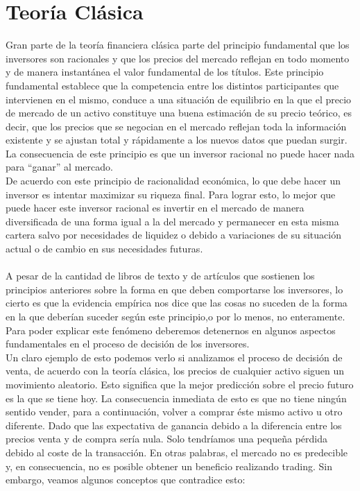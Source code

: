 \section{Teoría Clásica}

Gran parte de la teoría financiera clásica parte del principio fundamental que los inversores son racionales y que los precios del mercado reflejan en todo momento y de manera instantánea el valor fundamental de los títulos.
Este principio fundamental establece que la competencia entre los distintos participantes que intervienen en el mismo, conduce a una situación de equilibrio en la que el precio de mercado de un activo constituye una buena estimación de su precio teórico, es decir, que los precios que se negocian en el mercado reflejan toda la información existente y se ajustan total y rápidamente a los nuevos datos que puedan surgir. La consecuencia de este principio es que un inversor racional no puede hacer nada para “ganar” al mercado.\\	

De acuerdo con este principio de racionalidad económica, lo que debe hacer un inversor es intentar maximizar su riqueza final. Para lograr esto, lo mejor que puede hacer este inversor racional es invertir en el mercado de manera diversificada de una forma igual a la del mercado y permanecer en esta misma cartera salvo por necesidades de liquidez o debido a variaciones de su situación actual o de cambio en sus necesidades futuras.
\\\\
A pesar de la cantidad de libros de texto y de artículos que sostienen los principios anteriores sobre la forma en que deben comportarse los inversores, lo cierto es que la evidencia empírica nos dice que las cosas no suceden de la forma en la que deberían suceder según este principio,o por lo menos, no enteramente.
Para poder explicar este fenómeno deberemos detenernos en algunos aspectos fundamentales en el proceso de decisión de los inversores. 
\\
Un claro ejemplo de esto podemos verlo si analizamos el proceso de decisión de venta, de acuerdo con la teoría clásica, los precios de cualquier activo siguen un movimiento aleatorio. Esto significa que la mejor predicción sobre el precio futuro es la que se tiene hoy. La consecuencia inmediata de esto es que no tiene ningún sentido vender, para a continuación, volver a comprar éste mismo activo u otro diferente.
Dado que las expectativa de ganancia debido a la diferencia entre los precios venta y de compra sería nula. Solo tendríamos una pequeña pérdida debido al coste de la transacción.
En otras palabras, el mercado no es predecible y, en consecuencia, no es posible obtener un beneficio realizando trading. Sin embargo, veamos algunos conceptos que contradice esto:

